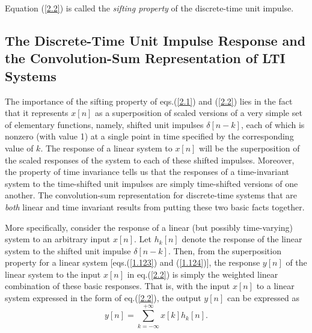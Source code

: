 \documentclass[a4paper,twoside]{book}
\begin{document}
Equation (\ref{2.2}) is called the \textit{sifting property} of the discrete-time unit impulse.

\subsection{The Discrete-Time Unit Impulse Response and the Convolution-Sum Representation of LTI Systems}

The importance of the sifting property of eqs.\;(\ref{2.1}) and (\ref{2.2}) lies in the fact that it represents $x[n]$ as a superposition of scaled versions of a very simple set of elementary functions, namely, shifted unit impulses $\delta[n-k]$, each of which is nonzero (with value 1) at a single point in time specified by the corresponding value of $k$. The response of a linear system to $x[n]$ will be the superposition of the scaled responses of the system to each of these shifted impulses. Moreover, the property of time invariance tells us that the responses of a time-invariant system to the time-shifted unit impulses are simply time-shifted versions of one another. The convolution-sum representation for discrete-time systems that are \textit{both} linear and time invariant results from putting these two basic facts together.

More specifically, consider the response of a linear (but possibly time-varying) system to an arbitrary input $x[n]$. Let $h_k[n]$ denote the response of the linear system to the shifted unit impulse $\delta[n-k]$. Then, from the superposition property for a linear system [eqs.\;(\ref{1.123}) and (\ref{1.124})], the response $y[n]$ of the linear system to the input $x[n]$ in eq.\;(\ref{2.2}) is simply the weighted linear combination of these basic responses. That is, with the input $x[n]$ to a linear system expressed in the form of eq.\;(\ref{2.2}), the output $y[n]$ can be expressed as
\begin{equation}
    y[n] = \sum_{k=-\infty}^{+\infty}x[k]h_{k}[n].
    \label{2.3}
\end{equation}
\end{document}
